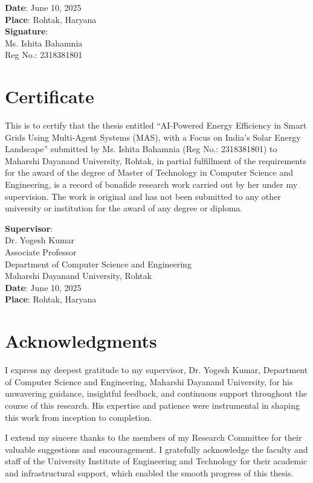 \documentclass[12pt, a4paper, oneside]{book}
\begin{document}
\vspace{1cm}
\textbf{Date}: June 10, 2025\\
\textbf{Place}: Rohtak, Haryana\\
\textbf{Signature}:\\
Ms. Ishita Bahamnia\\
Reg No.: 2318381801

\chapter*{Certificate}
This is to certify that the thesis entitled ``AI-Powered Energy Efficiency in Smart Grids Using Multi-Agent Systems (MAS), with a Focus on India’s Solar Energy Landscape'' submitted by Ms. Ishita Bahamnia (Reg No.: 2318381801) to Maharshi Dayanand University, Rohtak, in partial fulfillment of the requirements for the award of the degree of Master of Technology in Computer Science and Engineering, is a record of bonafide research work carried out by her under my supervision. The work is original and has not been submitted to any other university or institution for the award of any degree or diploma.

\vspace{1cm}
\textbf{Supervisor}:\\
Dr. Yogesh Kumar\\
Associate Professor\\
Department of Computer Science and Engineering\\
Maharshi Dayanand University, Rohtak\\
\textbf{Date}: June 10, 2025\\
\textbf{Place}: Rohtak, Haryana

\chapter*{Acknowledgments}
I express my deepest gratitude to my supervisor, Dr. Yogesh Kumar, Department of Computer Science and Engineering, Maharshi Dayanand University, for his unwavering guidance, insightful feedback, and continuous support throughout the course of this research. His expertise and patience were instrumental in shaping this work from inception to completion.

I extend my sincere thanks to the members of my Research Committee for their valuable suggestions and encouragement. I gratefully acknowledge the faculty and staff of the University Institute of Engineering and Technology for their academic and infrastructural support, which enabled the smooth progress of this thesis.
\end{document}
